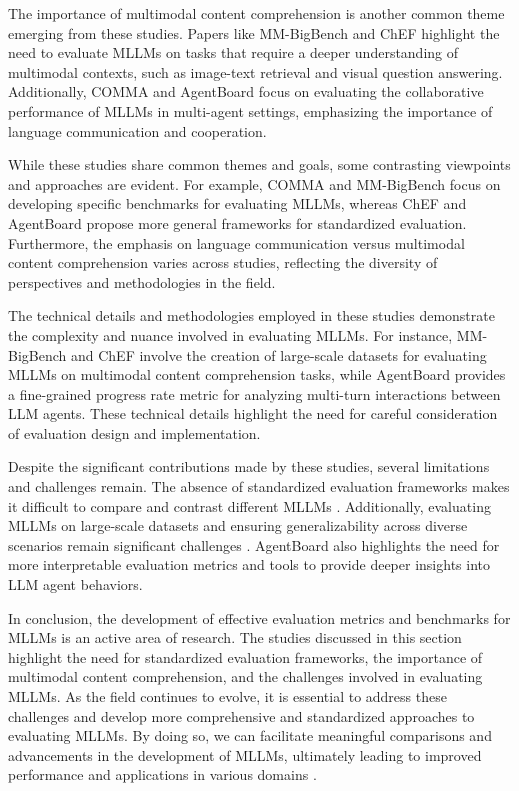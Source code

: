 \documentclass[conference]{IEEEtran}
\begin{document}
The importance of multimodal content comprehension is another common theme emerging from these studies. Papers like MM-BigBench \cite{b2} and ChEF \cite{b3} highlight the need to evaluate MLLMs on tasks that require a deeper understanding of multimodal contexts, such as image-text retrieval and visual question answering. Additionally, COMMA \cite{b1} and AgentBoard \cite{b4} focus on evaluating the collaborative performance of MLLMs in multi-agent settings, emphasizing the importance of language communication and cooperation.

While these studies share common themes and goals, some contrasting viewpoints and approaches are evident. For example, COMMA \cite{b1} and MM-BigBench \cite{b2} focus on developing specific benchmarks for evaluating MLLMs, whereas ChEF \cite{b3} and AgentBoard \cite{b4} propose more general frameworks for standardized evaluation. Furthermore, the emphasis on language communication versus multimodal content comprehension varies across studies, reflecting the diversity of perspectives and methodologies in the field.

The technical details and methodologies employed in these studies demonstrate the complexity and nuance involved in evaluating MLLMs. For instance, MM-BigBench \cite{b2} and ChEF \cite{b3} involve the creation of large-scale datasets for evaluating MLLMs on multimodal content comprehension tasks, while AgentBoard \cite{b4} provides a fine-grained progress rate metric for analyzing multi-turn interactions between LLM agents. These technical details highlight the need for careful consideration of evaluation design and implementation.

Despite the significant contributions made by these studies, several limitations and challenges remain. The absence of standardized evaluation frameworks makes it difficult to compare and contrast different MLLMs \cite{b1}. Additionally, evaluating MLLMs on large-scale datasets and ensuring generalizability across diverse scenarios remain significant challenges \cite{b2}. AgentBoard \cite{b4} also highlights the need for more interpretable evaluation metrics and tools to provide deeper insights into LLM agent behaviors.

In conclusion, the development of effective evaluation metrics and benchmarks for MLLMs is an active area of research. The studies discussed in this section highlight the need for standardized evaluation frameworks, the importance of multimodal content comprehension, and the challenges involved in evaluating MLLMs. As the field continues to evolve, it is essential to address these challenges and develop more comprehensive and standardized approaches to evaluating MLLMs. By doing so, we can facilitate meaningful comparisons and advancements in the development of MLLMs, ultimately leading to improved performance and applications in various domains \cite{b5}.
\end{document}
